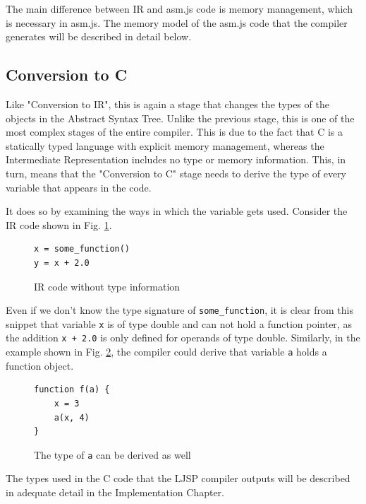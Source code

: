 \documentclass[11pt]{report}
\begin{document}
The main difference between IR and asm.js code is memory management, which is necessary in asm.js. The memory model of the asm.js code that the compiler generates will be described in detail below.


\subsection{Conversion to C}
Like "Conversion to IR", this is again a stage that changes the types of the objects in the Abstract Syntax Tree. Unlike the previous stage, this is one of the most complex stages of the entire compiler. This is due to the fact that C is a statically typed language with explicit memory management, whereas the Intermediate Representation includes no type or memory information. This, in turn, means that the "Conversion to C" stage needs to derive the type of every variable that appears in the code.

It does so by examining the ways in which the variable gets used. Consider the IR code shown in Fig. \ref{convc1}.
\begin{figure}[ht]
\begin{lstlisting}
x = some_function()
y = x + 2.0
\end{lstlisting}
\caption{IR code without type information}
\label{convc1}
\end{figure}

Even if we don't know the type signature of \texttt{some_function}, it is clear from this snippet that variable \texttt{x} is of type double and can not hold a function pointer, as the addition \texttt{x + 2.0} is only defined for operands of type double. Similarly, in the example shown in Fig. \ref{convc2}, the compiler could derive that variable \texttt{a} holds a function object.
\begin{figure}[ht]
\begin{lstlisting}
function f(a) {
    x = 3
    a(x, 4)
}
\end{lstlisting}
\caption{The type of \texttt{a} can be derived as well}
\label{convc2}
\end{figure}

The types used in the C code that the LJSP compiler outputs will be described in adequate detail in the Implementation Chapter.
\end{document}
